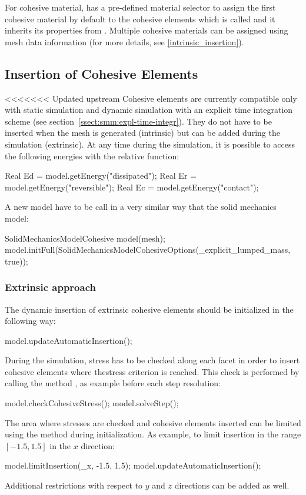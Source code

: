 For cohesive material, \akantu has a pre-defined material selector to assign 
the first cohesive material by default to the cohesive elements which is called 
 and it inherits its properties from 
. Multiple cohesive materials can be assigned 
using mesh data information (for more details, see \ref{intrinsic_insertion}).

\subsection{Insertion of Cohesive Elements}
<<<<<<< Updated upstream
Cohesive elements are currently compatible only with static simulation
and dynamic simulation with an explicit time integration scheme (see
section~\ref{ssect:smm:expl-time-integr}). They do not have to be inserted when the mesh is generated (intrinsic) but can be added during the simulation (extrinsic). At any time during the simulation, it is possible to access the following energies with the relative function:
\begin{cpp}
  Real Ed = model.getEnergy("dissipated");
  Real Er = model.getEnergy("reversible");
  Real Ec = model.getEnergy("contact");
\end{cpp}

A new model have to be call in a very similar way that the solid mechanics model:
\begin{cpp}
  SolidMechanicsModelCohesive model(mesh);
  model.initFull(SolidMechanicsModelCohesiveOptions(_explicit_lumped_mass, true));
\end{cpp} 


\subsubsection{Extrinsic approach}
The dynamic insertion of extrinsic cohesive elements should be initialized 
in the following way:
\begin{cpp}
  model.updateAutomaticInsertion();
\end{cpp} 
During the simulation, stress has to be checked along each facet in order to insert cohesive elements where thestress criterion is reached.
This check is performed by calling the method , as 
example before each step resolution:
\begin{cpp}
  model.checkCohesiveStress();
  model.solveStep();
\end{cpp}
The area where stresses are checked and cohesive elements inserted can be limited 
using the method  during initialization. As example, to 
limit insertion in the range $[-1.5, 1.5]$ in the $x$ direction: 
\begin{cpp}
  model.limitInsertion(_x, -1.5, 1.5);
  model.updateAutomaticInsertion();
\end{cpp} 
Additional restrictions with respect to $y$ and $z$ directions can be added as well.

